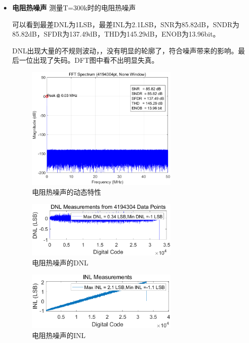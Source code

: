 \documentclass[cs4size,a4paper]{ctexart}
\numberwithin{equation}{section}
\numberwithin{table}{section}
\numberwithin{figure}{section}
\begin{document}
\begin{itemize}
		\item \textbf{电阻热噪声} 测量T=300k时的电阻热噪声
		
		可以看到最差DNL为1LSB，最差INL为2.1LSB，SNR为85.82dB，SNDR为85.82dB，SFDR为137.49dB，THD为145.29dB，ENOB为13.96bit。

		DNL出现大量的不规则波动，，没有明显的轮廓了，符合噪声带来的影响。最后一位出现了失码。DFT图中看不出明显失真。
		\begin{figure}[H]
			\centering
			\includegraphics[width=0.7\textwidth]{pic/KT/DFT.png}
			\caption{电阻热噪声的动态特性} 
		\end{figure}

		\begin{figure}[H]
			\centering
			\includegraphics[width=0.7\textwidth]{pic/KT/DNL.png}
			\caption{电阻热噪声的DNL} 
		\end{figure}

		\begin{figure}[H]
			\centering
			\includegraphics[width=0.7\textwidth]{pic/KT/INL.png}
			\caption{电阻热噪声的INL} 
		\end{figure}
	\end{itemize}
\end{document}
